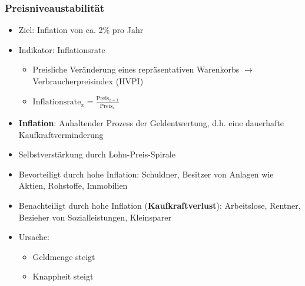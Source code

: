 \documentclass[titlepage,parskip=half]{scrartcl}
\begin{document}
\subsubsection{Preisniveaustabilität}
\begin{itemize}
    \item Ziel: Inflation von ca. 2\% pro Jahr
    \item Indikator: Inflationsrate
    \begin{itemize}
        \item Preisliche Veränderung eines repräsentativen Warenkorbs $\rightarrow$ Verbraucherpreisindex (HVPI)
        \item $\mathrm{Inflationsrate}_x = \frac{\mathrm{Preis}_{x+1}}{\mathrm{Preis}_x}$
    \end{itemize}
    \item \textbf{Inflation}: Anhaltender Prozess der Geldentwertung, d.h. eine dauerhafte Kaufkraftverminderung
    \item Selbstverstärkung durch Lohn-Preis-Spirale
    \item Bevorteiligt durch hohe Inflation: Schuldner, Besitzer von Anlagen wie Aktien, Rohstoffe, Immobilien
    \item Benachteiligt durch hohe Inflation (\textbf{Kaufkraftverlust}): Arbeitslose, Rentner, Bezieher von Sozialleistungen, Kleinsparer
    \item Ursache: 
    \begin{itemize}
        \item Geldmenge steigt
        \item Knappheit steigt
    \end{itemize}
\end{itemize}
\end{document}
